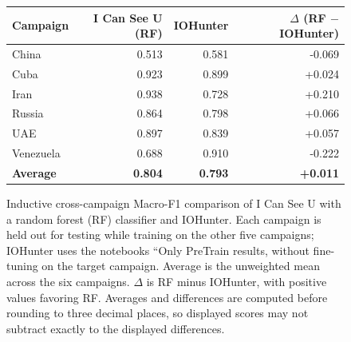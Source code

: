 \begin{figure}[htbp]
\centering
\begin{tabular}{lrrr}
\hline
Campaign & I Can See U (RF) & IOHunter & $\Delta$ (RF $-$ IOHunter) \\
\hline
China & 0.513 & 0.581 & -0.069 \\
Cuba & 0.923 & 0.899 & +0.024 \\
Iran & 0.938 & 0.728 & +0.210 \\
Russia & 0.864 & 0.798 & +0.066 \\
UAE & 0.897 & 0.839 & +0.057 \\
Venezuela & 0.688 & 0.910 & -0.222 \\
\hline
\textbf{Average} & \textbf{0.804} & \textbf{0.793} & \textbf{+0.011} \\
\hline
\end{tabular}
\caption{Inductive cross-campaign Macro-F1 comparison of I Can See U with a random forest (RF) classifier and IOHunter. Each campaign is held out for testing while training on the other five campaigns; IOHunter uses the notebook\textquotesingle{}s ``Only PreTrain results, without fine-tuning on the target campaign. Average is the unweighted mean across the six campaigns. $\Delta$ is RF minus IOHunter, with positive values favoring RF. Averages and differences are computed before rounding to three decimal places, so displayed scores may not subtract exactly to the displayed differences.}
\label{fig:inductive-rf-iohunter-macro-f1}
\end{figure}
